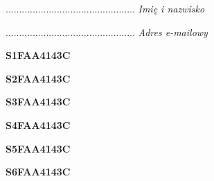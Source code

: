 \begin{turn}{90}\begin{minipage}{\linewidth} \vspace{20mm} ................................................  \textit{Imię i nazwisko}\end{minipage}\end{turn}

\begin{turn}{90}\begin{minipage}{\linewidth} \vspace{20mm} ................................................  \textit{Adres e-mailowy}\end{minipage}\end{turn}

\begin{turn}{90}\huge \begin{minipage}{\linewidth} \vspace{10mm}\textbf{S1FAA4143C}\end{minipage}\end{turn}

\begin{turn}{90}\huge \begin{minipage}{\linewidth} \vspace{10mm}\textbf{S2FAA4143C}\end{minipage}\end{turn}

\begin{turn}{90}\huge \begin{minipage}{\linewidth} \vspace{10mm}\textbf{S3FAA4143C}\end{minipage}\end{turn}

\begin{turn}{90}\huge \begin{minipage}{\linewidth} \vspace{10mm}\textbf{S4FAA4143C}\end{minipage}\end{turn}

\begin{turn}{90}\huge \begin{minipage}{\linewidth} \vspace{10mm}\textbf{S5FAA4143C}\end{minipage}\end{turn}

\begin{turn}{90}\huge \begin{minipage}{\linewidth} \vspace{10mm}\textbf{S6FAA4143C}\end{minipage}\end{turn}

